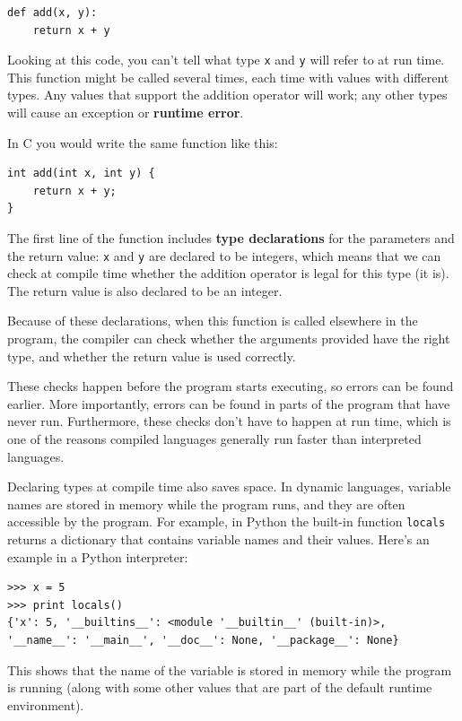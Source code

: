 \documentclass[12pt]{book}
\begin{document}
{\begin{verbatim}
def add(x, y):
    return x + y
\end{verbatim}

Looking at this code, you can't tell what type {\tt x} and {\tt y}
will refer to at run time.  This function might be called several
times, each time with values with different types.  Any values that
support the addition operator will work; any other types will cause an
exception or {\bf runtime error}.

In C you would write the same function like this:

\begin{verbatim}
int add(int x, int y) {
    return x + y;
}
\end{verbatim}

The first line of the function includes {\bf type declarations} for the
parameters and the return value: {\tt x} and {\tt y} are declared to
be integers, which means that we can check at compile time
whether the addition operator is legal for this type (it is).  The
return value is also declared to be an integer.

Because of these declarations, when this function is called elsewhere
in the program, the compiler can check whether the arguments provided
have the right type, and whether the return value is used correctly.

These checks happen before the program starts executing, so errors can
be found earlier.  More importantly, errors can be found in parts
of the program that have never run.  Furthermore, these checks don't
have to happen at run time, which is one of the reasons compiled
languages generally run faster than interpreted languages.

Declaring types at compile time also saves space.  In dynamic
languages, variable names are stored in memory while the program runs,
and they are often accessible by the program.  For example, in Python
the built-in function {\tt locals} returns a dictionary that contains
variable names and their values.  Here's an example in a Python
interpreter:

\begin{verbatim}
>>> x = 5
>>> print locals()
{'x': 5, '__builtins__': <module '__builtin__' (built-in)>,
'__name__': '__main__', '__doc__': None, '__package__': None}
\end{verbatim}

This shows that the name of the variable is stored in memory while
the program is running (along with some other values that are part
of the default runtime environment).

}
\end{document}
